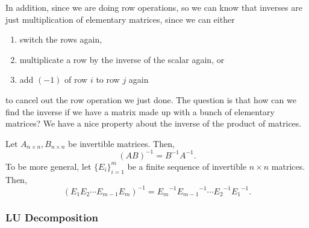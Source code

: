 \documentclass[11pt]{article}
\theoremstyle{break}
\theoremstyle{no_label}
\numberwithin{equation}{section}
\begin{document}
In addition, since we are doing row operations, so we can know that inverses are just multiplication of elementary matrices, since we can either \begin{enumerate}
    \item switch the rows again,
    \item multiplicate a row by the inverse of the scalar again, or
    \item add $(-1)$ of row $i$ to row $j$ again
\end{enumerate}
to cancel out the row operation we just done. The question is that how can we find the inverse if we have a matrix made up with a bunch of elementary matrices? We have a nice property about the inverse of the product of matrices.

\begin{theorem}
    Let $A_{n\times n}, B_{n\times n}$ be invertible matrices. Then, $$(AB)^{-1}=B^{-1}A^{-1}.$$ To be more general, let $\{E_i\}_{i=1}^m$ be a finite sequence of invertible $n\times n$ matrices. Then, $$(E_1E_2\cdots E_{m-1}E_m)^{-1}={E_m}^{-1}{E_{m-1}}^{-1}\cdots{E_2}^{-1}{E_1}^{-1}.$$
\end{theorem}

\subsubsection*{LU Decomposition}
\end{document}
